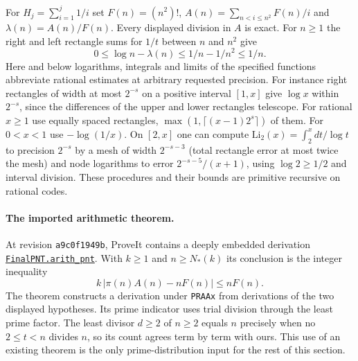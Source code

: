 For $H_j=\sum_{i=1}^j1/i$ set $F(n)=(n^2)!$, $A(n)=\sum_{n<i\le n^2} F(n)/i$ and $\lambda(n)=A(n)/F(n)$. Every displayed division in $A$ is exact. For $n\ge1$ the right and left rectangle sums for $1/t$ between $n$ and $n^2$ give
\begin{equation}\label{eq:growth-harm}
 0\le\log n-\lambda(n)\le 1/n-1/n^2\le1/n.
\end{equation}
Here and below logarithms, integrals and limits of the specified functions abbreviate rational estimates at arbitrary requested precision. For instance right rectangles of width at most $2^{-s}$ on a positive interval $[1,x]$ give $\log x$ within $2^{-s}$, since the differences of the upper and lower rectangles telescope. For rational $x\ge1$ use equally spaced rectangles, $\max(1,\lceil (x-1)2^s\rceil)$ of them. For $0<x<1$ use $-\log(1/x)$. On $[2,x]$ one can compute $\mathrm{Li}_2(x)=\int_2^xdt/\log t$ to precision $2^{-s}$ by a mesh of width $2^{-s-3}$ (total rectangle error at most twice the mesh) and node logarithms to error $2^{-s-5}/(x+1)$, using $\log2\ge1/2$ and interval division. These procedures and their bounds are primitive recursive on rational codes.

\paragraph{The imported arithmetic theorem.}
At revision \texttt{a9c0f1949b}, ProveIt contains a deeply embedded derivation
\href{https://github.com/VladimirReshetnikov/ProveIt/blob/a9c0f1949be61679ed2e219b97dc42ecb7ae91a9/Logic/PrimitiveRecursiveArithmetic/Derivations/Lean/IPRADerivations/AnalyticNumberTheory/FinalPNT.lean}{\texttt{FinalPNT.arith\_pnt}}. With $k\ge1$ and $n\ge N_*(k)$ its conclusion is the integer inequality
\begin{equation}\label{eq:growth-embedded}
 k\,|\pi(n)A(n)-nF(n)|\le nF(n).
\end{equation}
The theorem constructs a derivation under \texttt{PRAAx} from derivations of the two displayed hypotheses. Its prime indicator uses trial division through the least prime factor. The least divisor $d\ge2$ of $n\ge2$ equals $n$ precisely when no $2\le t<n$ divides $n$, so its count agrees term by term with ours. This use of an existing theorem is the only prime-distribution input for the rest of this section.

